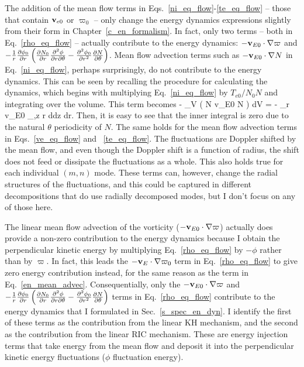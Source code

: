 The addition of the mean flow terms in Eqs.~\ref{ni_eq_flow}-\ref{te_eq_flow} -- those that contain ${\bf v}_{e0}$ or $\varpi_0$ -- only change the energy dynamics expressions slightly
from their form in Chapter~\ref{c_en_formalism}. In fact, only two terms -- both in Eq.~\ref{rho_eq_flow} -- actually
contribute to the energy dynamics: $- {\mathbf v_{E0}} \cdot \nabla \varpi$ and 
$-\frac{1}{r} \frac{\partial\phi_0}{\partial r} \left(\frac{\partial N_0}{\partial r} \frac{\partial^2\phi}{\partial r \partial\theta} - \frac{\partial^2\phi_0}{\partial r^2} \frac{\partial N}{\partial\theta} \right) \nonumber$.
Mean flow advection terms such as $- {\mathbf v_{E0}} \cdot \nabla N$ in Eq.~\ref{ni_eq_flow}, perhaps surprisingly, do not contribute to the energy dynamics. 
This can be seen by recalling the procedure for calculating the dynamics, which begins with multiplying Eq.~\ref{ni_eq_flow} by $T_{e0}/N_0 N$ and integrating over the volume. This term becomes
\beq
\label{en_mean_advec}
- \int_V \left(  N {\mathbf v_{E0}} \cdot \grad N \right) dV = -  \int_r v_{E0}  \int_{\theta,z}  r d\theta dz dr.
\eeq
Then, it is easy to see that the inner integral is zero due to the natural $\theta$ periodicity of $N$. The same holds for the mean flow advection terms in Eqs.~\ref{ve_eq_flow} and
~\ref{te_eq_flow}. The fluctuations are Doppler shifted by the mean flow, and even though the Doppler shift is a function of radius, the shift does not feed or dissipate the fluctuations
as a whole. This also holds true for each individual $(m,n)$ mode. 
These terms can, however, change the radial structures of the fluctuations, and this could be captured in different decompositions that do use radially decomposed modes,
but I don't focus on any of those here.

The linear mean flow advection of the vorticity ($- {\mathbf v_{E0}} \cdot \nabla \varpi$) actually does provide a non-zero contribution to the energy dynamics because I obtain
the perpendicular kinetic energy by multiplying Eq.~\ref{rho_eq_flow} by $-\phi$ rather than by $\varpi$. In fact, this leads the $- {\mathbf v_{E}} \cdot \nabla \varpi_0$ term in Eq.~\ref{rho_eq_flow}
to give zero energy contribution instead, for the same reason as the term in Eq.~\ref{en_mean_advec}.
Consequentially, only the $- {\mathbf v_{E0}} \cdot \nabla \varpi$ and 
$-\frac{1}{r} \frac{\partial\phi_0}{\partial r} \left(\frac{\partial N_0}{\partial r} \frac{\partial^2\phi}{\partial r \partial\theta} - \frac{\partial^2\phi_0}{\partial r^2} \frac{\partial N}{\partial\theta} \right) \nonumber$ terms in Eq.~\ref{rho_eq_flow} contribute to the energy
dynamics that I formulated in Sec.~\ref{s_spec_en_dyn}. I identify the first of these terms as the contribution from the linear KH mechanism, and the second as the contribution from the
linear RIC mechanism. These are energy injection terms that take energy from the mean flow and deposit it into the perpendicular kinetic energy fluctuations ($\phi$ fluctuation energy).

